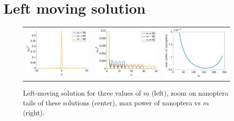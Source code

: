 \documentclass{article}
\begin{document}
\section{Left moving solution}

\begin{figure}[H]
    \centering
    \begin{tabular}{ccc}
    \includegraphics[width=5cm]{leftm} &
    \includegraphics[width=5cm]{leftmnanop} &
    \includegraphics[width=5cm]{leftnanopmax} \\
    \end{tabular}
    \caption{Left-moving solution for three values of $m$ (left), zoom on nanoptera tails of these solutions (center), max power of nanoptera vs $m$ (right).}
    \label{fig:left1}
\end{figure}
\end{document}
